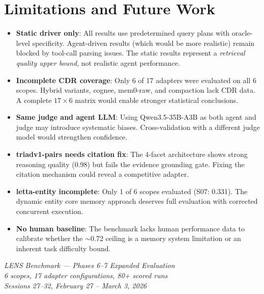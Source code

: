 \documentclass[11pt,letterpaper]{article}
\begin{document}
\section{Limitations and Future Work}
\label{sec:future}

\begin{itemize}[nosep]
  \item \textbf{Static driver only}: All results use predetermined query plans with oracle-level specificity. Agent-driven results (which would be more realistic) remain blocked by tool-call parsing issues. The static results represent a \emph{retrieval quality upper bound}, not realistic agent performance.
  \item \textbf{Incomplete CDR coverage}: Only 6 of 17 adapters were evaluated on all 6 scopes. Hybrid variants, cognee, mem0-raw, and compaction lack CDR data. A complete $17 \times 6$ matrix would enable stronger statistical conclusions.
  \item \textbf{Same judge and agent LLM}: Using Qwen3.5-35B-A3B as both agent and judge may introduce systematic biases. Cross-validation with a different judge model would strengthen confidence.
  \item \textbf{triadv1-pairs needs citation fix}: The 4-facet architecture shows strong reasoning quality (0.98) but fails the evidence grounding gate. Fixing the citation mechanism could reveal a competitive adapter.
  \item \textbf{letta-entity incomplete}: Only 1 of 6 scopes evaluated (S07: 0.331). The dynamic entity core memory approach deserves full evaluation with corrected concurrent execution.
  \item \textbf{No human baseline}: The benchmark lacks human performance data to calibrate whether the $\sim$0.72 ceiling is a memory system limitation or an inherent task difficulty bound.
\end{itemize}

\vfill
\begin{center}
\small
\textit{LENS Benchmark --- Phases 6--7 Expanded Evaluation}\\
\textit{6 scopes, 17 adapter configurations, 80+ scored runs}\\
\textit{Sessions 27--32, February 27 -- March 3, 2026}
\end{center}
\end{document}
